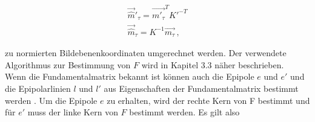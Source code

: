 \begin{gather}
	\overrightarrow{\hat{m}}'_\tau = \overrightarrow{m'_\tau}^TK'^{-T}\\
	\overrightarrow{\hat{m}}_\tau = K^{-1}\overrightarrow{m_\tau} \, ,\label{eq:equ8}
\end{gather}

zu normierten Bildebenenkoordinaten umgerechnet werden\cite{HZ,phdextrinsicPara}.  Der verwendete Algorithmus zur Bestimmung von $F$ wird in Kapitel 3.3 näher beschrieben.\\












Wenn die Fundamentalmatrix bekannt ist können auch die Epipole $e$ und $e'$ und die Epipolarlinien $l$ und $l'$ aus Eigenschaften der Fundamentalmatrix bestimmt werden \cite{HZ,phdTwoView,HZ8,ZZGXr,phdextrinsicPara}. Um die Epipole $e$ zu erhalten, wird der rechte Kern von F bestimmt und für $e'$ muss der linke Kern von $F$ bestimmt werden\cite{HZ,phdTwoView,HZ8,ZZGXr,phdextrinsicPara}. Es gilt also%

